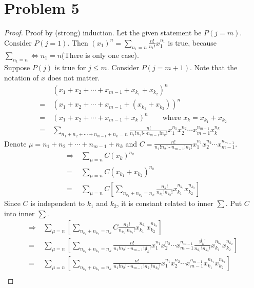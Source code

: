 \section*{Problem 5}
	\begin{proof}
		Proof by (strong) induction. Let the given statement be $P(j = m)$. Consider $P(j = 1)$. Then $(x_1)^n = \sum\limits_{n_1 = n}\frac{n!}{n_1!}x_1^{n_1}$ is true, because $\sum\limits_{n_1 = n} \Leftrightarrow n_1 = n$(There is only one case).\\
		Suppose $P(j)$ is true for $j \leq m$. Consider $P(j = m + 1)$. Note that the notation of $x$ does not matter.
		\begin{align*}
			& (x_1 + x_2 + \cdots + x_{m - 1} + x_{k_1} + x_{k_2})^n\\
			=\ & \left(x_1 + x_2 + \cdots + x_{m - 1} + (x_{k_1} + x_{k_2})\right)^n\\
			=\ & (x_1 + x_2 + \cdots + x_{m - 1} + x_k)^n\qquad \mbox{where }x_k = x_{k_1} + x_{k_2}\\
			=\ & \sum\limits_{n_1 + n_2 + \cdots + n_{m - 1} + n_k = n}\frac{n!}{n_1!n_2!\cdots n_{m - 1}!n_k!}x_1^{n_1}x_2^{n_2}\cdots x_{m - 1}^{n_{m - 1}}x_k^{n_k}
		\end{align*}
		Denote $\mu = n_1 + n_2 + \cdots + n_{m - 1} + n_k$ and $C = \frac{n!}{n_1!n_2!\cdots n_{m - 1}!n_k!}x_1^{n_1}x_2^{n_2}\cdots x_{m - 1}^{n_{m - 1}}$.
		\begin{align*}
			\Rightarrow\ & \sum\limits_{\mu = n}C(x_k)^{n_k}\\
			=\ & \sum\limits_{\mu = n}C(x_{k_1} + x_{k_2})^{n_k}\\
			=\ & \sum\limits_{\mu = n}C\left[\sum\limits_{n_{k_1} + n_{k_2} = n_k}\frac{n_k!}{n_{k_1}!n_{k_2}!}x_{k_1}^{n_{k_1}}x_{k_2}^{n_{k_2}}\right]
		\end{align*}
		Since $C$ is independent to $k_1$ and $k_2$, it is constant related to inner $\sum$. Put $C$ into inner $\sum$.
		\begin{align*}
			\Rightarrow\ & \sum\limits_{\mu = n}\left[\sum\limits_{n_{k_1} + n_{k_2} = n_k}C\frac{n_k!}{n_{k_1}!n_{k_2}!}x_{k_1}^{n_{k_1}}x_{k_2}^{n_{k_2}}\right]\\
			=\ & \sum\limits_{\mu = n}\left[\sum\limits_{n_{k_1} + n_{k_2} = n_k}\frac{n!}{n_1!n_2!\cdots n_{m - 1}!\not n_k!}x_1^{n_1}x_2^{n_2}\cdots x_{m - 1}^{n_{m - 1}}\frac{\not n_k!}{n_{k_1}!n_{k_2}!}x_{k_1}^{n_{k_1}}x_{k_2}^{n_{k_2}}\right]\\
			=\ & \sum\limits_{\mu = n}\left[\sum\limits_{n_{k_1} + n_{k_2} = n_k}\frac{n!}{n_1!n_2!\cdots n_{m - 1}!n_{k_1}!n_{k_2}!}x_1^{n_1}x_2^{n_2}\cdots x_{m - 1}^{n_{m - 1}}x_{k_1}^{n_{k_1}}x_{k_2}^{n_{k_2}}\right]\\

\end{align*}
\end{proof}
